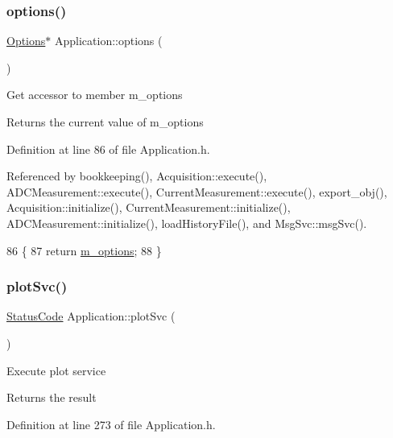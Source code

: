 \subsubsection{\texorpdfstring{options()}{options()}}
{\footnotesize\ttfamily \hyperlink{classOptions}{Options}$\ast$ Application\+::options (\begin{DoxyParamCaption}{ }\end{DoxyParamCaption})\hspace{0.3cm}{\ttfamily [inline]}}

Get accessor to member m\+\_\+options \begin{DoxyReturn}{Returns}
the current value of m\+\_\+options 
\end{DoxyReturn}


Definition at line 86 of file Application.\+h.



Referenced by bookkeeping(), Acquisition\+::execute(), A\+D\+C\+Measurement\+::execute(), Current\+Measurement\+::execute(), export\+\_\+obj(), Acquisition\+::initialize(), Current\+Measurement\+::initialize(), A\+D\+C\+Measurement\+::initialize(), load\+History\+File(), and Msg\+Svc\+::msg\+Svc().


\begin{DoxyCode}
86                       \{
87     \textcolor{keywordflow}{return} \hyperlink{classApplication_a3b0c74bf1ba99a5042990e3fefaa8963}{m\_options};
88   \}
\end{DoxyCode}
\mbox{\label{classApplication_a6344c22495ff3e87d77d0c47aea3bf00}} 
\subsubsection{\texorpdfstring{plot\+Svc()}{plotSvc()}}
{\footnotesize\ttfamily \hyperlink{classStatusCode}{Status\+Code} Application\+::plot\+Svc (\begin{DoxyParamCaption}{ }\end{DoxyParamCaption})\hspace{0.3cm}{\ttfamily [inline]}}

Execute plot service \begin{DoxyReturn}{Returns}
the result 
\end{DoxyReturn}


Definition at line 273 of file Application.\+h.


